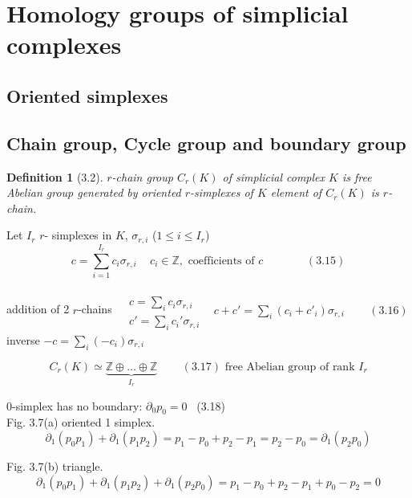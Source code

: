 \documentclass{book}
\newtheorem{definition}{Definition}
\begin{document}
\section{Homology groups of simplicial complexes}

\subsection{Oriented simplexes}

\subsection{Chain group, Cycle group and boundary group}

\begin{definition}[3.2] $r$-chain group $C_r(K)$ of simplicial complex $K$ is free Abelian group generated by oriented $r$-simplexes of $K$ element of $C_r(K)$ is $r$-chain.\end{definition}

Let $I_r$ $r$- simplexes in $K$, $\sigma_{r,i}$ ($1 \leq i \leq I_r$) 
\begin{equation}
c = \sum_{i=1}^{I_r} c_i \sigma_{r,i} \quad \, c_i \in \mathbb{Z}, \text{ coefficients of $c$ } \quad \quad \quad \, (3.15)
\end{equation}

addition of 2 $r$-chains $\begin{aligned} & \quad \\ 
  & c = \sum_i c_i \sigma_{r,i} \\ 
  & c' = \sum_i c_i' \sigma_{r,i} \end{aligned}$ \quad \quad \, $c + c' = \sum_i (c_i + c'_i) \sigma_{r,i} \quad \quad \, (3.16)$ \\

inverse $-c  =\sum_i ( - c_i) \sigma_{r,i}$ 

\begin{equation}
C_r(K) \simeq \underbrace{\mathbb{Z} \oplus \dots \oplus \mathbb{Z}}_{ I_r} \quad \quad \, (3.17) \text{ free Abelian group of rank $I_r$}
\end{equation}


$0$-simplex has no boundary: $\partial_0 p_0 = 0$ \quad \, (3.18) \\

Fig. 3.7(a) oriented 1 simplex.  
\[
\partial_1 (p_0 p_1) + \partial_1 (p_1 p_2) = p_1 - p_0 + p_2 - p_1 = p_2 - p_0 = \partial_1 (p_2 p_0)
\]

Fig. 3.7(b) triangle. 
\[
\partial_1 (p_0 p_1) + \partial_1 (p_1 p_2) + \partial_1 (p_2 p_0) = p_1 - p_0 + p_2 - p_1 + p_0 - p_2 = 0 
\]
\end{document}
